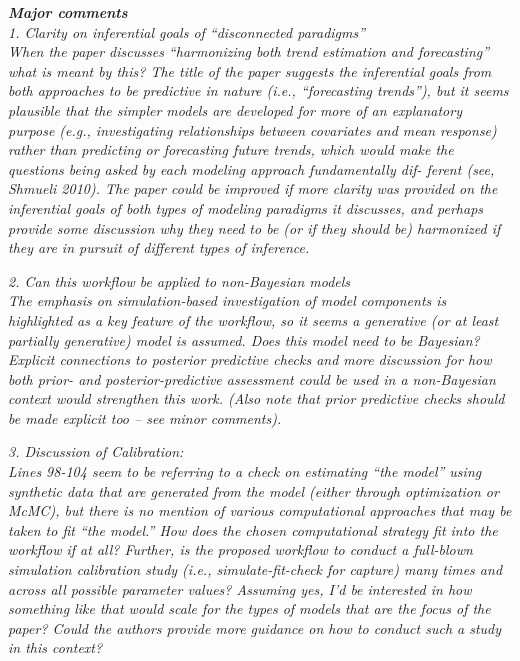 \documentclass[11pt,letter]{article}
\begin{document}

\begin{mybox}
\emph{\textbf{Major comments}\\
1. Clarity on inferential goals of “disconnected paradigms”\\
 When the paper discusses “harmonizing both trend estimation and forecasting” what is meant by this? The
title of the paper suggests the inferential goals from both approaches to be predictive
in nature (i.e., “forecasting trends”), but it seems plausible that the simpler models are
developed for more of an explanatory purpose (e.g., investigating relationships between
covariates and mean response) rather than predicting or forecasting future trends, which
would make the questions being asked by each modeling approach fundamentally dif-
ferent (see, Shmueli 2010). The paper could be improved if more clarity was provided
on the inferential goals of both types of modeling paradigms it discusses, and perhaps
provide some discussion why they need to be (or if they should be) harmonized if they
are in pursuit of different types of inference.}
\end{mybox}

\begin{mybox}
\emph{2. Can this workflow be applied to non-Bayesian models\\
The emphasis on simulation-based investigation of model components is highlighted as a key feature of
the workflow, so it seems a generative (or at least partially generative) model is assumed. Does this model need to be Bayesian? Explicit connections to posterior predictive checks and more discussion for how both prior- and posterior-predictive assessment could be used in a non-Bayesian context would strengthen this work. (Also note that prior predictive checks should be made explicit too – see minor comments).}
\end{mybox}

\begin{mybox}
\emph{3. Discussion of Calibration:\\
Lines 98-104 seem to be referring to a check on estimating
“the model” using synthetic data that are generated from the model (either through
optimization or McMC), but there is no mention of various computational approaches
that may be taken to fit “the model.” How does the chosen computational strategy fit
into the workflow if at all? Further, is the proposed workflow to conduct a full-blown
simulation calibration study (i.e., simulate-fit-check for capture) many times and across
all possible parameter values? Assuming yes, I’d be interested in how something like
that would scale for the types of models that are the focus of the paper? Could the
authors provide more guidance on how to conduct such a study in this context?}
\end{mybox}
\end{document}

